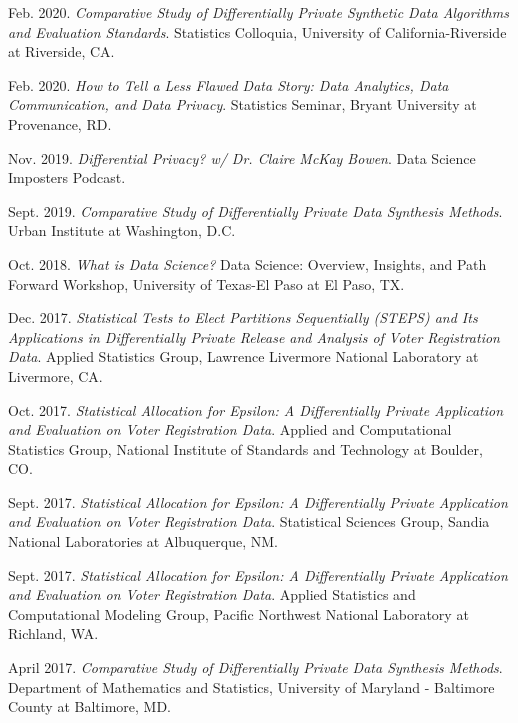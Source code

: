 \documentclass[11pt, letterpaper, roman]{moderncv} %
\begin{document}
\begin{etaremune}[topsep=0pt, itemsep=4pt, partopsep=0pt, parsep=0pt]
  \item Feb. 2020. \textit{Comparative Study of Differentially Private Synthetic Data Algorithms and Evaluation Standards}. Statistics Colloquia, University of California-Riverside at Riverside, CA.
  
  \item Feb. 2020. \textit{How to Tell a Less Flawed Data Story: Data Analytics, Data Communication, and Data Privacy}. Statistics Seminar, Bryant University at Provenance, RD.
  
  \item Nov. 2019. \textit{Differential Privacy? w/ Dr. Claire McKay Bowen}. Data Science Imposters Podcast.
  
  \item Sept. 2019. \textit{Comparative Study of Differentially Private Data Synthesis Methods}. Urban Institute at Washington, D.C.
  
  \item Oct. 2018. \textit{What is Data Science?} Data Science: Overview, Insights, and Path Forward Workshop, University of Texas-El Paso at El Paso, TX.

  \item Dec. 2017. \textit{Statistical Tests to Elect Partitions Sequentially (STEPS) and Its Applications in Differentially Private Release and Analysis of Voter Registration Data}. Applied Statistics Group, Lawrence Livermore National Laboratory at Livermore, CA.
  
  \item Oct. 2017. \textit{Statistical Allocation for Epsilon: A Differentially Private Application and Evaluation on Voter Registration Data}. Applied and Computational Statistics Group, National Institute of Standards and Technology at Boulder, CO.
  
  \item Sept. 2017. \textit{Statistical Allocation for Epsilon: A Differentially Private Application and Evaluation on Voter Registration Data}. Statistical Sciences Group, Sandia National Laboratories at Albuquerque, NM.
  
  \item Sept. 2017. \textit{Statistical Allocation for Epsilon: A Differentially Private Application and Evaluation on Voter Registration Data}. Applied Statistics and Computational Modeling Group, Pacific Northwest National Laboratory at Richland, WA.
  
  \item April 2017. \textit{Comparative Study of Differentially Private Data Synthesis Methods}. Department of Mathematics and Statistics, University of Maryland - Baltimore County at Baltimore, MD.
\end{etaremune}
\end{document}
